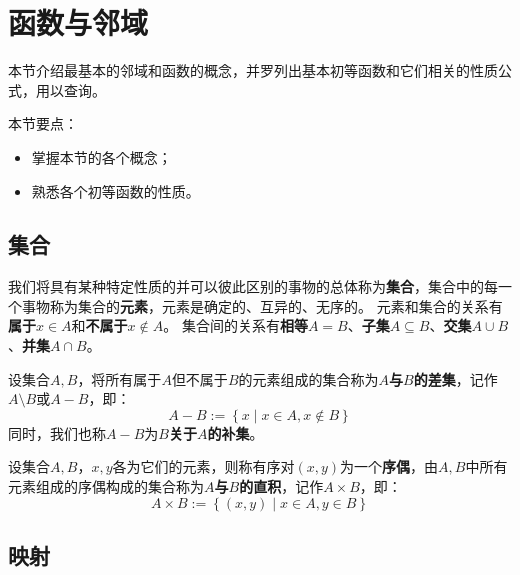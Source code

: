 \section{函数与邻域}

本节介绍最基本的邻域和函数的概念，并罗列出基本初等函数和它们相关的性质公式，用以查询。

本节要点：
\begin{itemize}
    \item 掌握本节的各个概念；
    \item 熟悉各个初等函数的性质。
\end{itemize}

\subsection{集合}

\begin{definition}[集合和元素]
我们将具有某种特定性质的并可以彼此区别的事物的总体称为{\bf 集合}，集合中的每一个事物称为集合的{\bf 元素}，元素是确定的、互异的、无序的。
元素和集合的关系有{\bf 属于}$x\in A$和{\bf 不属于}$x\notin A$。
集合间的关系有{\bf 相等}$A=B$、{\bf 子集}$A\subseteq B$、{\bf 交集}$A\cup B$、{\bf 并集}$A\cap B$。
\end{definition}

\begin{definition}[差集和补集]
设集合$A,B$，将所有属于$A$但不属于$B$的元素组成的集合称为{\bf $A$与$B$的差集}，记作$A\setminus B$或$A-B$，即：
\[
A-B:=\left\{ x \middle| x\in A,x\notin B \right\}
\]
同时，我们也称$A-B$为{\bf $B$关于$A$的补集}。
\end{definition}

\begin{definition}[直积]
设集合$A,B$，$x,y$各为它们的元素，则称有序对$\left( x,y \right) $为一个{\bf 序偶}，由$A,B$中所有元素组成的序偶构成的集合称为{\bf $A$与$B$的直积}，记作$A\times B$，即：
\[
A\times B:=\left\{ \left( x,y \right) \middle| x\in A,y\in B \right\}
\]
\end{definition}

\subsection{映射}

